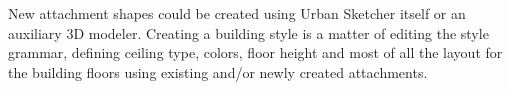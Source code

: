 New attachment shapes could be created using Urban Sketcher itself or an auxiliary 3D modeler.
Creating a building style is a matter of editing the style grammar, defining ceiling type, colors, floor height and most of all
the layout for the building floors using existing and/or newly created attachments.




%

%

%

%

%

%

